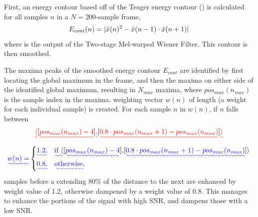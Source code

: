 \DIFdelend \DIFaddbegin {}\DIFaddend First, an energy contour based off of the Teager energy contour (\cite{teager:80}) is calculated for all samples $n$ in a $N=200$-sample frame, \begin{equation} E_{cont}(n) = |\DIFdelbegin %
\DIFdelend \DIFaddbegin \hat{x}\DIFaddend (n)^2 - \DIFdelbegin %
\DIFdelend \DIFaddbegin \hat{x}\DIFaddend (n-1) \cdot \DIFdelbegin %
\DIFdelend \DIFaddbegin \hat{x}\DIFaddend (n+1)| \end{equation} where \DIFdelbegin {}\DIFdelend \DIFaddbegin {}\DIFaddend is the output of the Two-stage Mel-warped Wiener Filter.  This contour is then smoothed.  
\DIFaddbegin 

\DIFaddend The maxima peaks of the smoothed energy contour $E_{cont}$ are identified by first locating the global maximum in the frame, and then the maxima on either side of the identified global maximum, resulting in $N_{max}$ \DIFaddbegin {}\DIFaddend maxima, where $pos_{max}(n_{max})$ is the sample index in the maxima. \DIFdelbegin {}\DIFdelend \DIFaddbegin {}\DIFaddend weighting vector $w(n)$ of length \DIFdelbegin {}\DIFdelend \DIFaddbegin {}\DIFaddend (a weight for each individual sample) is created.  For each sample $n$ in $w(n)$, if $n$ falls between 
\DIFdelbegin \begin{displaymath}\DIFdel{\label{eq:afe:swp:window} \langle }[\DIFdel{pos_{max}(n_{max})-4}]\DIFdel{, }[\DIFdel{0.8 \cdot pos_{max}(n_{max}+1)-pos_{max}(n_{max})}] \DIFdel{\rangle }\end{displaymath}%
\DIFdelend %
\DIFaddbegin \[\DIFadd{ w(n)= }\begin{cases} \DIFadd{1.2,}& \DIFadd{\text{if } \langle }[\DIFadd{pos_{max}(n_{max})-4}]\DIFadd{, }[\DIFadd{0.8 \cdot pos_{max}(n_{max}+1)-pos_{max}(n_{max})}] \rangle \\ \DIFadd{0.8,}& \DIFadd{\text{otherwise,}} \end{cases}  \]
 samples before a \DIFdelbegin {}\DIFdelend \DIFaddbegin {}\DIFaddend extending 80\% of the distance to the next \DIFdelbegin {}\DIFdelend \DIFaddbegin {}\DIFaddend are enhanced by \DIFaddbegin {}\DIFaddend weight value of 1.2, otherwise dampened by a weight value of 0.8.  This manages to enhance the portions of the signal with high SNR, and dampens those with a low SNR.  \DIFdelbegin %

